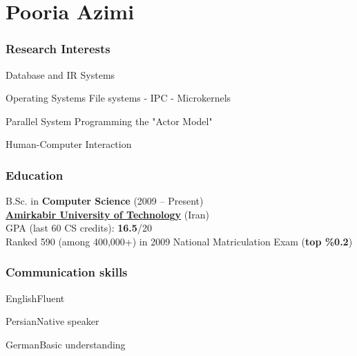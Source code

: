 \documentclass{tccv}
\begin{document}
\thispagestyle{empty}
\part{Pooria Azimi}




\section{Research Interests}


\begin{research_interest}

\item{Database and IR Systems}
     {}

\item{Operating Systems}
     {File systems - IPC - Microkernels}

\item{Parallel System Programming}
     {the "Actor Model"}

\item{Human-Computer Interaction}
     {}

\end{research_interest}








\section{Education}

B.Sc. in {\bf Computer Science} (2009 -- Present)
\\[1.5pt]
{\bf \href{https://en.wikipedia.org/wiki/Amirkabir_University_of_Technology}{Amirkabir University of Technology}} (Iran)
\\[1.7pt]
GPA (last 60 CS credits): {\bf 16.5}/20
\bigskip\\
Ranked 590 (among 400,000+) in 2009 National Matriculation Exam ({\bf top \%0.2})








\section{Communication skills}


\begin{factlist}

\item{English}{Fluent}

\item{Persian}{Native speaker}

\item{German}{Basic understanding}

\end{factlist}
\end{document}
